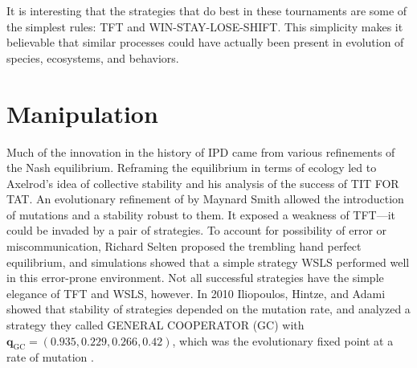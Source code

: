 It is interesting that the strategies that do best in these tournaments are some of the simplest rules: TFT and WIN-STAY-LOSE-SHIFT. This simplicity makes it believable that similar processes could have actually been present in evolution of species, ecosystems, and behaviors.






\chapter{Manipulation}

Much of the innovation in the history of IPD came from various refinements of the Nash equilibrium. Reframing the equilibrium in terms of ecology led to Axelrod's idea of collective stability and his analysis of the success of TIT FOR TAT. An evolutionary refinement of by Maynard Smith allowed the introduction of mutations and a stability robust to them. It exposed a weakness of TFT---it could be invaded by a pair of strategies. To account for possibility of error or miscommunication, Richard Selten \cite{Selten_1975} proposed the trembling hand perfect equilibrium, and simulations showed that a simple strategy WSLS performed well in this error-prone environment. Not all successful strategies have the simple elegance of TFT and WSLS, however. In 2010 Iliopoulos, Hintze, and Adami showed that stability of strategies depended on the mutation rate, and analyzed a strategy they called GENERAL COOPERATOR (GC) with $\mathbf{q}_{\textrm{GC}} = (0.935, 0.229, 0.266, 0.42)$, which was the evolutionary fixed point at a rate of mutation \cite{iliopoulos_2010}.

